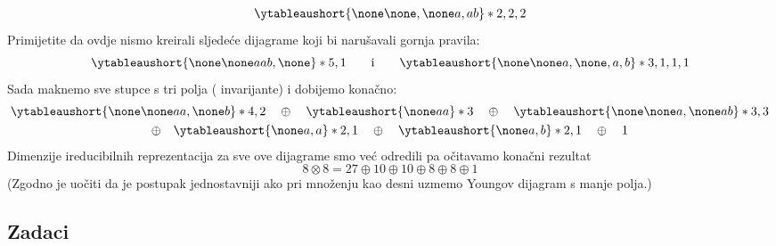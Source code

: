 \begin{primjer}[$8 \otimes 8$ u \SU{3}]
\begin{multline*}
\ytableaushort{\none \none , \none a, a b} * {2, 2, 2}
\end{multline*}
Primijetite da ovdje nismo kreirali sljedeće dijagrame koji
bi narušavali gornja pravila:
\begin{displaymath}
\ytableaushort{\none \none a a b, \none} * {5, 1}
\qquad \text{i} \qquad
\ytableaushort{\none \none a, \none, a, b} * {3, 1,1, 1}
\end{displaymath}
Sada maknemo sve stupce s tri polja ( invarijante)
i dobijemo konačno:
\begin{multline*}
\ytableaushort{\none \none a a,\none b} * {4, 2}
\quad\oplus\quad 
\ytableaushort{\none a a} * {3}
\quad\oplus\quad 
\ytableaushort{\none \none a, \none a b} * {3, 3} \\
\oplus\quad 
\ytableaushort{\none a, a} * {2, 1}
\quad\oplus\quad 
\ytableaushort{\none a,  b} * {2, 1}
\quad\oplus\quad 
1
\end{multline*}
Dimenzije ireducibilnih reprezentacija za sve ove dijagrame smo već odredili pa
očitavamo konačni rezultat
\begin{equation}
8 \otimes 8 = 27 \oplus 10 \oplus 10 \oplus 8 \oplus 8 \oplus 1
\label{eq:8x8}
\end{equation}
(Zgodno je uočiti da je postupak jednostavniji ako pri množenju
kao desni uzmemo Youngov dijagram s manje polja.)

\end{primjer}

\subsection*{Zadaci}

